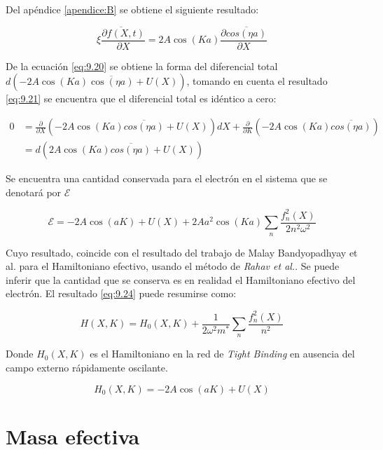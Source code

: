 Del apéndice \ref{apendice:B} se obtiene el siguiente resultado:

    \begin{equation}\label{eq:9.21}
        \overline{\xi \frac{\partial f(X,t)}{\partial X}}=2A\cos(Ka)\frac{\partial\overline{cos(\eta a)}}{\partial X}
    \end{equation}
 
 De la ecuación \ref{eq:9.20} se obtiene la forma del diferencial total $d\left(-2A\cos(Ka)\overline{\cos(\eta a)}+U(X)\right)$, tomando en cuenta el resultado \ref{eq:9.21} se encuentra que el diferencial total es idéntico a cero:
 
 \begin{equation}
    \begin{split}
     0&=\frac{\partial}{\partial X} \left(-2A\cos(Ka)\overline{cos(\eta a)}+U(X)\right)dX+\frac{\partial}{\partial K}\left(-2A\cos(Ka)\overline{cos(\eta a)}\right)\\
     &=d\left(2A\cos(Ka)\overline{cos(\eta a)}+U(X)\right)
     \end{split}
 \end{equation}
 
 Se encuentra una cantidad conservada para el electrón en el sistema que se denotará por $\mathcal{E}$
 
    
\begin{equation}\label{eq:9.24}
    \mathcal{E}=-2A\cos(aK)+U(X)+2Aa^2\cos(Ka)\sum_n\frac{f_n^2(X)}{2n^2\omega^2}
\end{equation}  

Cuyo resultado, coincide con el resultado del trabajo de Malay Bandyopadhyay et al. \cite{datta} para el Hamiltoniano efectivo, usando el método de \textit{Rahav et al.}. Se puede inferir que la cantidad que se conserva es en realidad el Hamiltoniano efectivo del electrón. El resultado \ref{eq:9.24} puede resumirse como: 

\begin{equation}\label{eq:9.25}
    H(X,K)=H_0(X,K)+\frac{1}{2\omega^2m^*}\sum_n\frac{f_n^2(X)}{n^2}
\end{equation}

Donde $H_0(X,K)$ es el Hamiltoniano en la red de \textit{Tight Binding} en ausencia del campo externo rápidamente oscilante.

\begin{equation}\label{eq:9.26}
    H_0(X,K)=-2A\cos(aK)+U(X)
\end{equation}


\section{Masa efectiva}

